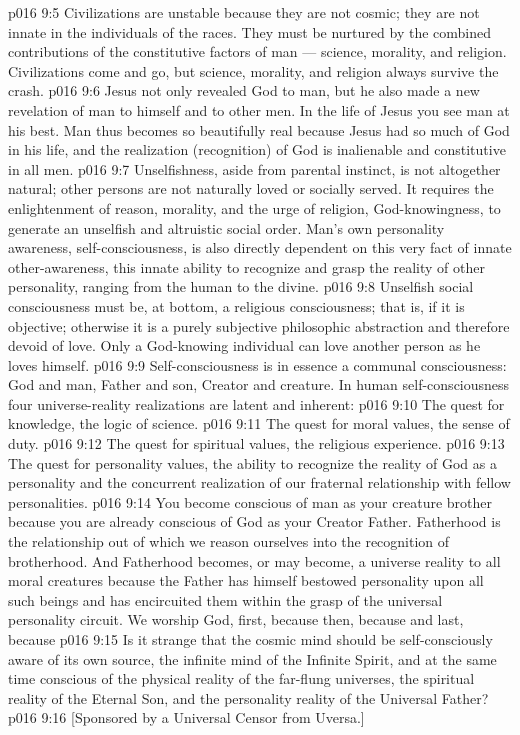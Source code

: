 \vs p016 9:5 Civilizations are unstable because they are not cosmic; they are not innate in the individuals of the races. They must be nurtured by the combined contributions of the constitutive factors of man --- science, morality, and religion. Civilizations come and go, but science, morality, and religion always survive the crash.
\vs p016 9:6 Jesus not only revealed God to man, but he also made a new revelation of man to himself and to other men. In the life of Jesus you see man at his best. Man thus becomes so beautifully real because Jesus had so much of God in his life, and the realization (recognition) of God is inalienable and constitutive in all men.
\vs p016 9:7 \pc Unselfishness, aside from parental instinct, is not altogether natural; other persons are not naturally loved or socially served. It requires the enlightenment of reason, morality, and the urge of religion, God\hyp{}knowingness, to generate an unselfish and altruistic social order. Man’s own personality awareness, self\hyp{}consciousness, is also directly dependent on this very fact of innate other\hyp{}awareness, this innate ability to recognize and grasp the reality of other personality, ranging from the human to the divine.
\vs p016 9:8 Unselfish social consciousness must be, at bottom, a religious consciousness; that is, if it is objective; otherwise it is a purely subjective philosophic abstraction and therefore devoid of love. Only a God\hyp{}knowing individual can love another person as he loves himself.
\vs p016 9:9 Self\hyp{}consciousness is in essence a communal consciousness: God and man, Father and son, Creator and creature. In human self\hyp{}consciousness four universe\hyp{}reality realizations are latent and inherent:
\vs p016 9:10 \bibnobreakspace The quest for knowledge, the logic of science.
\vs p016 9:11 \bibnobreakspace The quest for moral values, the sense of duty.
\vs p016 9:12 \bibnobreakspace The quest for spiritual values, the religious experience.
\vs p016 9:13 \bibnobreakspace The quest for personality values, the ability to recognize the reality of God as a personality and the concurrent realization of our fraternal relationship with fellow personalities.
\vs p016 9:14 \pc You become conscious of man as your creature brother because you are already conscious of God as your Creator Father. Fatherhood is the relationship out of which we reason ourselves into the recognition of brotherhood. And Fatherhood becomes, or may become, a universe reality to all moral creatures because the Father has himself bestowed personality upon all such beings and has encircuited them within the grasp of the universal personality circuit. We worship God, first, because  then, because  and last, because 
\vs p016 9:15 Is it strange that the cosmic mind should be self\hyp{}consciously aware of its own source, the infinite mind of the Infinite Spirit, and at the same time conscious of the physical reality of the far\hyp{}flung universes, the spiritual reality of the Eternal Son, and the personality reality of the Universal Father?
\vsetoff
\vs p016 9:16 [Sponsored by a Universal Censor from Uversa.]
\quizlink
